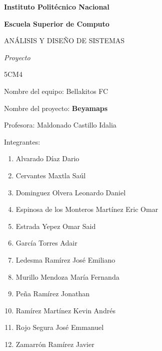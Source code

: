 \documentclass{article}
\begin{document}
\begin{titlepage}
\centering
{\bfseries\LARGE Instituto Politécnico Nacional \par}
\vspace{.5cm}
{\bfseries\LARGE Escuela Superior de Computo \par}
\vspace{1cm}
\Large ANÁLISIS Y DISEÑO DE SISTEMAS \par
\vspace{1cm}
\itshape\LARGE Proyecto \par
\vspace{1cm}
\LARGE 5CM4\par
\vspace{1cm}
\begin{FlushLeft}
\Large Nombre del equipo: Bellakitos FC\par
\Large Nombre del proyecto: \textbf{Beyamaps}\par
\vspace{0.5cm}
\Large Profesora: Maldonado Castillo Idalia	 \par
\vspace{0.5cm}
    Integrantes:\\
    \begin{enumerate}
    \item Alvarado Díaz Dario\\
   \item Cervantes Maxtla Saúl\\
    \item Dominguez Olvera Leonardo Daniel\\
    \item Espinosa de los Monteros Martínez Eric Omar\\
   \item Estrada Yepez Omar Said\\
   \item García Torres Adair\\
   \item Ledesma Ramírez José Emiliano\\
   \item Murillo Mendoza María Fernanda\\
   \item Peña Ramírez Jonathan\\
   \item Ramírez Martínez Kevin Andrés\\
   \item Rojo Segura José Emmanuel\\
   \item Zamarrón Ramírez Javier\\
    \end{enumerate}
\vspace{.5cm}
\end{FlushLeft}
\end{titlepage}
\tableofcontents
\newpage
\end{document}
